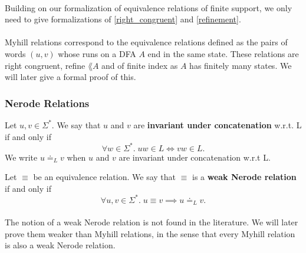 \paragraph{}
Building on our formalization of equivalence relations of finite support, 
we only need to give formalizations of \ref{right_congruent} and \ref{refinement}.


\paragraph{}
Myhill relations correspond to the equivalence relations 
defined as the pairs of words $(u, v)$ whose runs on a DFA $A$ end in the same state. 
These relations are right congruent, refine $\lang{A}$ and of finite index as $A$ has finitely many states. 
We will later give a formal proof of this.

\subsubsection{Nerode Relations}

\begin{definition}
    \label{equal_suffix}
    Let $u, v \in \Sigma^*$. We say that $u$ and $v$ are \textbf{invariant under concatenation} w.r.t. L if and only if
    \begin{equation*}
        \forall w \in \Sigma^*. \; uw \in L \Leftrightarrow vw \in L. 
    \end{equation*}
    We write $u \doteq_L v$ when $u$ and $v$ are invariant under concatenation w.r.t L.
\end{definition}

\begin{definition}
    \label{Weak_Nerode_Rel}
    Let $\equiv$ be an equivalence relation. We say that $\equiv$ is a \textbf{weak Nerode relation} if and only if
    \begin{equation*}
        \forall u, v \in \Sigma^*. \; u \equiv v \implies u \doteq_L v.
    \end{equation*}
\end{definition}



\paragraph{}
The notion of a weak Nerode relation is not found in the literature.
We will later prove them weaker than Myhill relations, in the sense that every Myhill relation is also a weak Nerode relation.

